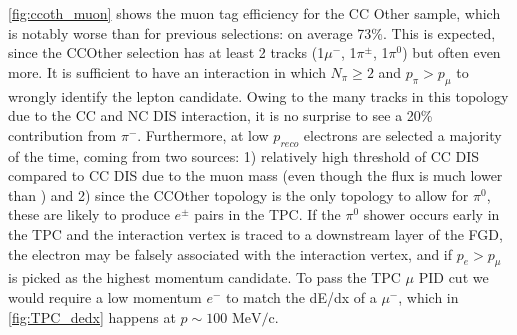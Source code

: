 \autoref{fig:ccoth_muon} shows the muon tag efficiency for the CC Other sample, which is notably worse than for previous selections: on average 73\%. This is expected, since the CCOther selection has at least 2 tracks (1$\mu^-$, 1$\pi^{\pm}$, 1$\pi^0$) but often even more. It is sufficient to have an interaction in which $N_\pi \ge 2$ and $p_{\pi} > p_{\mu}$ to wrongly identify the lepton candidate. Owing to the many tracks in this topology due to the CC and NC DIS interaction, it is no surprise to see a 20\% contribution from $\pi^-$. Furthermore, at low $p_{reco}$ electrons are selected a majority of the time, coming from two sources: 1) relatively high threshold of \numu CC DIS compared to \nue CC DIS due to the muon mass (even though the \nue flux is much lower than \numu) and 2) since the CCOther topology is the only topology to allow for $\pi^0$, these are likely to produce $e^\pm$ pairs in the TPC. If the $\pi^0$ shower occurs early in the TPC and the interaction vertex is traced to a downstream layer of the FGD, the electron may be falsely associated with the interaction vertex, and if $p_e > p_\mu$ is picked as the highest momentum candidate. To pass the TPC $\mu$ PID cut we would require a low momentum $e^-$ to match the dE/dx of a $\mu^-$, which in \autoref{fig:TPC_dedx} happens at $p\sim100\text{ MeV/c}$.
